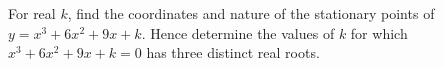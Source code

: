 For real $k$, find the coordinates and nature of the stationary points of $y=x^3+6x^2+9x+k$. Hence determine the values of $k$ for which $x^3+6x^2+9x+k=0$ has three distinct real roots.

